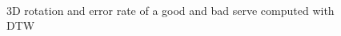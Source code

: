 \begin{figure}[tbp]
	\centering
	\quad
	\\	
	\caption{3D rotation and error rate of a good and bad serve computed with DTW}
    \label{fig-good-bad}
\end{figure}